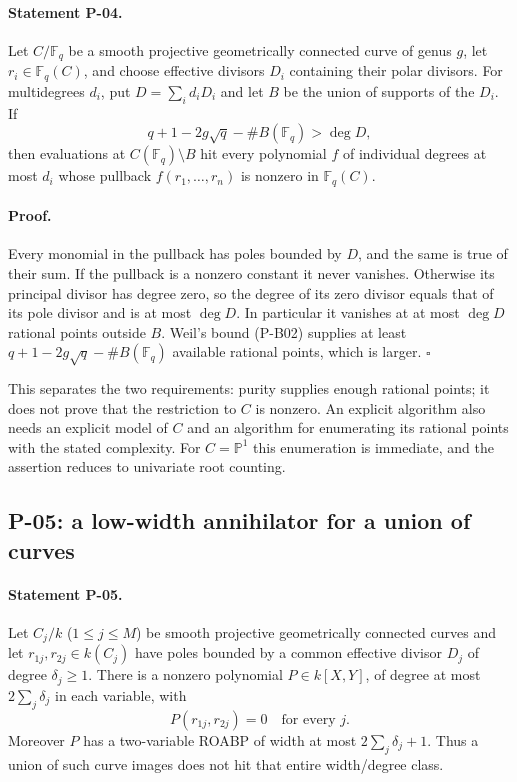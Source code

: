 \documentclass[11pt,a4paper]{article}
\theoremstyle{definition}\newtheorem{definition}{Definition}
\begin{document}
\paragraph{Statement P-04.}
Let $C/\mathbb F_q$ be a smooth projective geometrically connected curve of genus $g$, let $r_i\in\mathbb F_q(C)$, and choose effective divisors $D_i$ containing their polar divisors. For multidegrees $d_i$, put $D=\sum_i d_iD_i$ and let $B$ be the union of supports of the $D_i$. If
\[
 q+1-2g\sqrt q-\#B(\mathbb F_q)>\deg D,
\]
then evaluations at $C(\mathbb F_q)\setminus B$ hit every polynomial $f$ of individual degrees at most $d_i$ whose pullback $f(r_1,\ldots,r_n)$ is nonzero in $\mathbb F_q(C)$.
\paragraph{Proof.}
Every monomial in the pullback has poles bounded by $D$, and the same is true of their sum. If the pullback is a nonzero constant it never vanishes. Otherwise its principal divisor has degree zero, so the degree of its zero divisor equals that of its pole divisor and is at most $\deg D$. In particular it vanishes at at most $\deg D$ rational points outside $B$. Weil's bound (P-B02) supplies at least $q+1-2g\sqrt q-\#B(\mathbb F_q)$ available rational points, which is larger. $\square$

This separates the two requirements: purity supplies enough rational points; it does not prove that the restriction to $C$ is nonzero. An explicit algorithm also needs an explicit model of $C$ and an algorithm for enumerating its rational points with the stated complexity. For $C=\mathbb P^1$ this enumeration is immediate, and the assertion reduces to univariate root counting.

\subsection{P-05: a low-width annihilator for a union of curves}
\paragraph{Statement P-05.}
Let $C_j/k$ ($1\le j\le M$) be smooth projective geometrically connected curves and let $r_{1j},r_{2j}\in k(C_j)$ have poles bounded by a common effective divisor $D_j$ of degree $\delta_j\ge1$. There is a nonzero polynomial $P\in k[X,Y]$, of degree at most $2\sum_j\delta_j$ in each variable, with
\[
 P(r_{1j},r_{2j})=0\quad\text{for every }j.
\]
Moreover $P$ has a two-variable ROABP of width at most $2\sum_j\delta_j+1$. Thus a union of such curve images does not hit that entire width/degree class.
\end{document}
